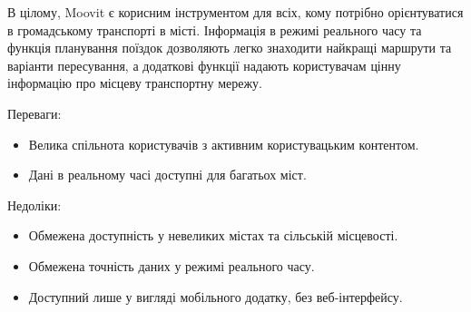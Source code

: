 В цілому, Moovit є корисним інструментом для всіх, кому потрібно орієнтуватися в громадському транспорті в місті. Інформація в режимі реального часу та функція планування поїздок дозволяють легко знаходити найкращі маршрути та варіанти пересування, а додаткові функції надають користувачам цінну інформацію про місцеву транспортну мережу.

Переваги:
\begin{itemize}
    \item Велика спільнота користувачів з активним користувацьким контентом.
    \item Дані в реальному часі доступні для багатьох міст.
\end{itemize}

Недоліки:
\begin{itemize}
    \item Обмежена доступність у невеликих містах та сільській місцевості.
    \item Обмежена точність даних у режимі реального часу.
    \item Доступний лише у вигляді мобільного додатку, без веб-інтерфейсу.
\end{itemize}
